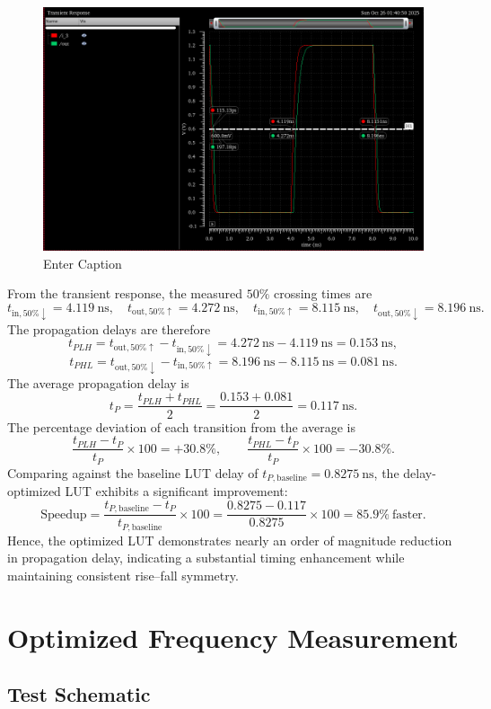 \documentclass[12pt]{article}
\begin{document}
\begin{figure}[H]
    \centering
    \includegraphics[width=0.5\linewidth]{writeup//figures/updated_delay_opt.png}
    \caption{Enter Caption}
\end{figure}
From the transient response, the measured $50\%$ crossing times are
\[
t_{\text{in},50\%\downarrow} = 4.119~\text{ns}, \quad
t_{\text{out},50\%\uparrow} = 4.272~\text{ns}, \quad
t_{\text{in},50\%\uparrow} = 8.115~\text{ns}, \quad
t_{\text{out},50\%\downarrow} = 8.196~\text{ns}.
\]
The propagation delays are therefore
\[
t_{PLH} = t_{\text{out},50\%\uparrow} - t_{\text{in},50\%\downarrow}
        = 4.272~\text{ns} - 4.119~\text{ns}
        = \boxed{0.153~\text{ns}},
\]
\[
t_{PHL} = t_{\text{out},50\%\downarrow} - t_{\text{in},50\%\uparrow}
        = 8.196~\text{ns} - 8.115~\text{ns}
        = \boxed{0.081~\text{ns}}.
\]
The average propagation delay is
\[
t_P = \frac{t_{PLH} + t_{PHL}}{2}
     = \frac{0.153 + 0.081}{2}
     = \boxed{0.117~\text{ns}}.
\]
The percentage deviation of each transition from the average is
\[
\frac{t_{PLH} - t_P}{t_P} \times 100 = \boxed{+30.8\%}, 
\qquad
\frac{t_{PHL} - t_P}{t_P} \times 100 = \boxed{-30.8\%}.
\]
Comparing against the baseline LUT delay of $t_{P,\text{baseline}} = 0.8275~\text{ns}$, the delay-optimized LUT exhibits a significant improvement:
\[
\text{Speedup} 
= \frac{t_{P,\text{baseline}} - t_P}{t_{P,\text{baseline}}} \times 100
= \frac{0.8275 - 0.117}{0.8275} \times 100
= \boxed{85.9\%~\text{faster}}.
\]
Hence, the optimized LUT demonstrates nearly an order of magnitude reduction in propagation delay, indicating a substantial timing enhancement while maintaining consistent rise–fall symmetry.





\newpage

\section{Optimized Frequency Measurement}
\subsection{Test Schematic}
\end{document}
